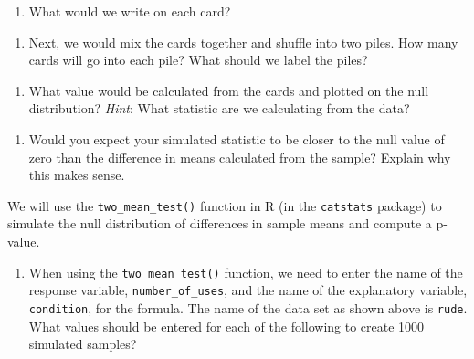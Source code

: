 \documentclass[
]{report}
\providecommand{\tightlist}{%
  \setlength{\itemsep}{0pt}\setlength{\parskip}{0pt}}
\begin{document}
\vspace{0.3in}

\begin{enumerate}
\def\labelenumi{\arabic{enumi}.}
\setcounter{enumi}{10}
\tightlist
\item
  What would we write on each card?
\end{enumerate}

\vspace{0.3in}

\begin{enumerate}
\def\labelenumi{\arabic{enumi}.}
\setcounter{enumi}{11}
\tightlist
\item
  Next, we would mix the cards together and shuffle into two piles. How many cards will go into each pile? What should we label the piles?
\end{enumerate}

\vspace{.8in}

\begin{enumerate}
\def\labelenumi{\arabic{enumi}.}
\setcounter{enumi}{12}
\tightlist
\item
  What value would be calculated from the cards and plotted on the null distribution? \emph{Hint}: What statistic are we calculating from the data?
\end{enumerate}

\vspace{0.3in}

\begin{enumerate}
\def\labelenumi{\arabic{enumi}.}
\setcounter{enumi}{13}
\tightlist
\item
  Would you expect your simulated statistic to be closer to the null value of zero than the difference in means calculated from the sample? Explain why this makes sense.
\end{enumerate}

\vspace{0.8in}

We will use the \texttt{two\_mean\_test()} function in R (in the \texttt{catstats} package) to simulate the null distribution of differences in sample means and compute a p-value.

\newpage

\begin{enumerate}
\def\labelenumi{\arabic{enumi}.}
\setcounter{enumi}{14}
\tightlist
\item
  When using the \texttt{two\_mean\_test()} function, we need to enter the name of the response variable, \texttt{number\_of\_uses}, and the name of the explanatory variable, \texttt{condition}, for the formula. The name of the data set as shown above is \texttt{rude}. What values should be entered for each of the following to create 1000 simulated samples?
\end{enumerate}
\end{document}
